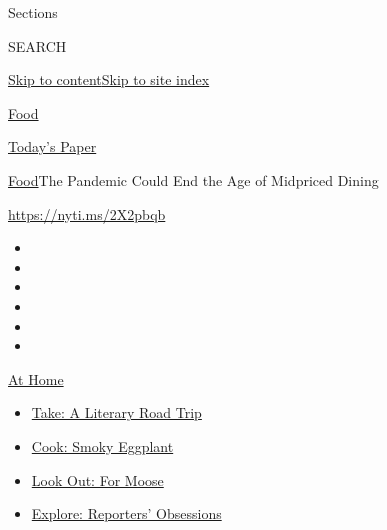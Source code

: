 Sections

SEARCH

\protect\hyperlink{site-content}{Skip to
content}\protect\hyperlink{site-index}{Skip to site index}

\href{https://www.nytimes3xbfgragh.onion/section/food}{Food}

\href{https://myaccount.nytimes3xbfgragh.onion/auth/login?response_type=cookie\&client_id=vi}{}

\href{https://www.nytimes3xbfgragh.onion/section/todayspaper}{Today's
Paper}

\href{/section/food}{Food}\textbar{}The Pandemic Could End the Age of
Midpriced Dining

\url{https://nyti.ms/2X2pbqb}

\begin{itemize}
\item
\item
\item
\item
\item
\item
\end{itemize}

\href{https://www.nytimes3xbfgragh.onion/spotlight/at-home?action=click\&pgtype=Article\&state=default\&region=TOP_BANNER\&context=at_home_menu}{At
Home}

\begin{itemize}
\tightlist
\item
  \href{https://www.nytimes3xbfgragh.onion/2020/07/28/books/time-for-a-literary-road-trip.html?action=click\&pgtype=Article\&state=default\&region=TOP_BANNER\&context=at_home_menu}{Take:
  A Literary Road Trip}
\item
  \href{https://www.nytimes3xbfgragh.onion/2020/07/29/magazine/bored-with-your-home-cooking-some-smoky-eggplant-will-fix-that.html?action=click\&pgtype=Article\&state=default\&region=TOP_BANNER\&context=at_home_menu}{Cook:
  Smoky Eggplant}
\item
  \href{https://www.nytimes3xbfgragh.onion/2020/07/27/travel/moose-michigan-isle-royale.html?action=click\&pgtype=Article\&state=default\&region=TOP_BANNER\&context=at_home_menu}{Look
  Out: For Moose}
\item
  \href{https://www.nytimes3xbfgragh.onion/interactive/2020/at-home/even-more-reporters-editors-diaries-lists-recommendations.html?action=click\&pgtype=Article\&state=default\&region=TOP_BANNER\&context=at_home_menu}{Explore:
  Reporters' Obsessions}
\end{itemize}

